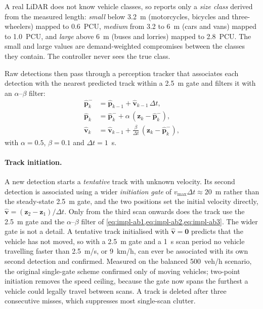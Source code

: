 A real LiDAR does not know vehicle classes, so \vls{} reports only a \emph{size class} derived from the
measured length: \emph{small} below 3.2~m (motorcycles, bicycles and three-wheelers) mapped to
0.6~PCU, \emph{medium} from 3.2 to 6~m (cars and vans) mapped to 1.0~PCU, and \emph{large} above
6~m (buses and lorries) mapped to 2.8~PCU.  The small and large values are demand-weighted compromises between the classes they contain. The controller never sees the true class.

Raw detections then pass through a perception tracker that associates each detection with the nearest
predicted track within a 2.5~m gate and filters it with an $\alpha$--$\beta$ filter:
\begin{align}
  \hat{\mathbf{p}}^{-}_{k} &= \hat{\mathbf{p}}_{k-1} + \hat{\mathbf{v}}_{k-1}\,\Delta t, \label{eq:impl-ab1}\\
  \hat{\mathbf{p}}_{k} &= \hat{\mathbf{p}}^{-}_{k} + \alpha\,(\mathbf{z}_k - \hat{\mathbf{p}}^{-}_{k}), \label{eq:impl-ab2}\\
  \hat{\mathbf{v}}_{k} &= \hat{\mathbf{v}}_{k-1} + \frac{\beta}{\Delta t}\,(\mathbf{z}_k - \hat{\mathbf{p}}^{-}_{k}), \label{eq:impl-ab3}
\end{align}
with $\alpha = 0.5$, $\beta = 0.1$ and $\Delta t = 1$~s.

\paragraph{Track initiation.} A new detection starts a \emph{tentative} track with unknown velocity. Its
second detection is associated using a wider \emph{initiation gate} of $v_{\max}\Delta t \approx 20$~m rather
than the steady-state 2.5~m gate, and the two positions set the initial velocity directly,
$\hat{\mathbf{v}} = (\mathbf{z}_2 - \mathbf{z}_1)/\Delta t$. Only from the third scan onwards does the track
use the 2.5~m gate and the $\alpha$--$\beta$ filter of
\cref{eq:impl-ab1,eq:impl-ab2,eq:impl-ab3}. The wider gate is not a detail. A tentative track initialised with
$\hat{\mathbf{v}} = \mathbf{0}$ predicts that the vehicle has not moved, so with a 2.5~m gate and a 1~s scan
period no vehicle travelling faster than 2.5~m/s, or 9~km/h, can ever be associated with its own second
detection and confirmed. Measured on the balanced 500~veh/h scenario, the original single-gate scheme
confirmed only  of moving vehicles; two-point initiation removes the speed ceiling, because the
gate now spans the furthest a vehicle could legally travel between scans. A track is deleted after three
consecutive misses, which suppresses most single-scan clutter.

